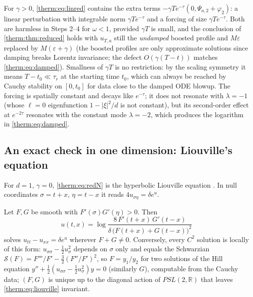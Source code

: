 \begin{remark}[Damping]\label{therm:rem:damping}
For $\gamma>0$, \cref{therm:eq:linred} contains the extra terms $-\gamma Te^{-\tau}(0,\Psi_{a,2}+\varphi_2)$: a
linear perturbation with integrable norm $\gamma Te^{-\tau}$ and a forcing of size
$\gamma Te^{-\tau}$.  Both are harmless in Steps 2--4 for $\omega<1$, provided $\gamma T$ is
small, and the conclusion of \cref{therm:thm:reduced} holds with $u_{T,a}$ still the
\emph{undamped} boosted profile and $M\varepsilon$ replaced by $M(\varepsilon+\gamma)$ (the boosted
profiles are only approximate solutions since damping breaks Lorentz invariance;
the defect $O(\gamma(T-t))$ matches \cref{therm:eq:damped}).  Smallness of $\gamma T$ is
no restriction: by the scaling symmetry it means $T-t_0\ll\tau_r$ at the
starting time $t_0$, which can always be reached by Cauchy stability on
$[0,t_0]$ for data close to the damped ODE blowup.  The forcing is spatially
constant and decays like $e^{-\tau}$; it does not resonate with $\lambda=-1$ (whose
$\ell=0$ eigenfunction $1-|\xi|^2/d$ is not constant), but its second-order effect at
$e^{-2\tau}$ resonates with the constant mode $\lambda=-2$, which produces the logarithm in
\cref{therm:eq:damped}.
\end{remark}

\subsection{An exact check in one dimension: Liouville's equation}
\label{therm:sec:liouville}

For $d=1$, $\gamma=0$, \cref{therm:eq:redN} is the hyperbolic Liouville equation
\cite{Liouville1853}.  In null coordinates $\sigma=t+x$, $\eta=t-x$ it reads
$4u_{\sigma\eta}=\delta e^u$.

\begin{proposition}\label{therm:prop:liouville-formula}
Let $F,G$ be smooth with $F'(\sigma)G'(\eta)>0$.  Then
\begin{equation}\label{therm:eq:liouville}
  u(t,x)=\log\frac{8\,F'(t+x)\,G'(t-x)}{\delta\,\bigl(F(t+x)+G(t-x)\bigr)^2}
\end{equation}
solves $u_{tt}-u_{xx}=\delta e^u$ wherever $F+G\neq0$.  Conversely, every $C^2$
solution is locally of this form: $u_{\sigma\sigma}-\frac12u_\sigma^2$ depends on $\sigma$ only
and equals the Schwarzian $\mathcal S(F)=F'''/F'-\frac32(F''/F')^2$, so $F=y_1/y_2$ for
two solutions of the Hill equation $y''+\frac12(u_{\sigma\sigma}-\frac12u_\sigma^2)y=0$
(similarly $G$), computable from the Cauchy data; $(F,G)$ is unique up to the
diagonal action of $PSL(2,\mathbb{R})$ that leaves \cref{therm:eq:liouville} invariant.
\end{proposition}

